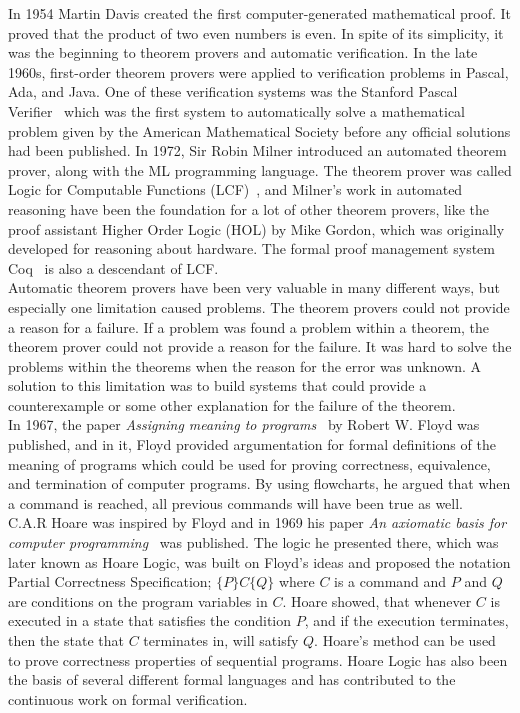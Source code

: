 In 1954 Martin Davis created the first computer-generated mathematical proof. It proved that the product of two even numbers is even. In spite of its simplicity, it was the beginning to theorem provers and automatic verification.
In the late 1960s, first-order theorem provers were applied to verification problems in Pascal, Ada, and Java. One of these verification systems was the Stanford Pascal Verifier~\cite{Luckham1979} which was the first system to automatically solve a mathematical problem given by the American Mathematical Society before any official solutions had been published.
In 1972, Sir Robin Milner introduced an automated theorem prover, along with the ML programming language. The theorem prover was called Logic for Computable Functions (LCF)~\cite{Milner1972}, and Milner's work in automated reasoning have been the foundation for a lot of other theorem provers, like the proof assistant Higher Order Logic (HOL) by Mike Gordon, which was originally developed for reasoning about hardware. The formal proof management system Coq~\cite{coq} is also a descendant of LCF.\\

Automatic theorem provers have been very valuable in many different ways, but especially one limitation caused problems. The theorem provers could not provide a reason for a failure. If a problem was found a problem within a theorem, the theorem prover could not provide a reason for the failure. It was hard to solve the problems within the theorems when the reason for the error was unknown. A solution to this limitation was to build systems that could provide a counterexample or some other explanation for the failure of the theorem. \\

In 1967, the paper \textit{Assigning meaning to programs}~\cite{Floyd1967} by Robert W. Floyd was published, and in it, Floyd provided argumentation for formal definitions of the meaning of programs which could be used for proving correctness, equivalence, and termination of computer programs. By using flowcharts, he argued that when a command is reached, all previous commands will have been true as well.\\

C.A.R Hoare was inspired by Floyd and in 1969 his paper \textit{An axiomatic basis for computer programming}~\cite{Hoare1969} was published. The logic he presented there, which was later known as Hoare Logic, was built on Floyd's ideas and proposed the notation Partial Correctness Specification; $\{P\} C \{Q\}$ where $C$ is a command and $P$ and $Q$ are conditions on the program variables in $C$. Hoare showed, that whenever $C$ is executed in a state that satisfies the condition $P$, and if the execution terminates, then the state that $C$ terminates in, will satisfy $Q$.
Hoare's method can be used to prove correctness properties of sequential programs. Hoare Logic has also been the basis of several different formal languages and has contributed to the continuous work on formal verification.\\


